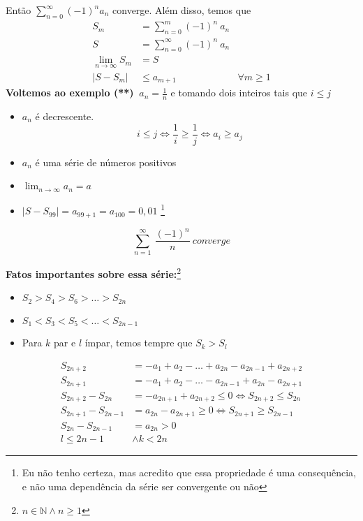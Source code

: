 \documentclass[12pt,openany]{book}
\begin{document}
Então $\displaystyle{\sum_{n=0}^{\infty} (-1)^n a_n}$ converge. Além disso, temos que \begin{align}
S_m &= \sum_{n=0}^m (-1)^n \ a_n \\
S &= \sum_{n=0}^{\infty} (-1)^n \ a_n \\
\lim_{n \rightarrow \infty} S_m &= S \\
|S-S_m| &\leq a_{m+1} & \forall m \geq 1
\end{align}
\textbf{Voltemos ao exemplo (**)} $ \ \displaystyle{a_n = \frac{1}{n}}$ e tomando dois inteiros tais que $i \leq j$ \begin{itemize}
\item $a_n$ é decrescente. $$ i \leq j \Longleftrightarrow \frac{1}{i} \geq \frac{1}{j} \Longleftrightarrow a_i \geq a_j $$ 
\item $a_n$ é uma série de números positivos
\item $\displaystyle{\lim_{n \rightarrow \infty} a_n = a}$
\item $\displaystyle{|S-S_{99}| = a_{99+1} = a_{100} = 0,01}$ \footnote{Eu não tenho certeza, mas acredito que essa propriedade é uma consequência, e não uma dependência da série ser convergente ou não}
\end{itemize}
$$\sum_{n=1}^\infty \ \frac{(-1)^n}{n} \ converge$$ 

\textbf{Fatos importantes sobre essa série:}\footnote{$n \in \mathds{N} \land n \geq 1$}
\begin{itemize}
\item $S_2 > S_4 > S_6 > \hdots > S_{2n}$
\item $S_1 < S_3 < S_5 < \hdots < S_{2n-1}$
\item Para $k$ par e $l$ ímpar, temos tempre que $S_k > S_l$
\end{itemize}

\begin{align}
S_{2n+2} &= -a_1 + a_2 - \hdots + a_{2n} - a_{2n-1} + a_{2n+2}\\
S_{2n+1} &= -a_1 + a_2 - \hdots - a_{2n-1} + a_{2n} - a_{2n+1}\\
S_{2n+2} - S_{2n} &= -a_{2n+1} + a_{2n+2} \leq 0 \Longleftrightarrow S_{2n+2} \leq S_{2n} \label{212A}\\
S_{2n+1} - S_{2n-1} &= a_{2n} - a_{2n+1} \geq 0 \Longleftrightarrow S_{2n+1} \geq S_{2n-1} \label{212B}\\
S_{2n} - S_{2n-1} &= a_{2n} > 0 \label{212C} \\
l \leq 2n-1 &\land k < 2n
\end{align}
\end{document}
